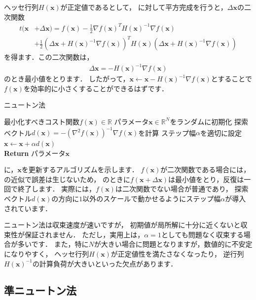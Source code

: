ヘッセ行列$H(\bm{x})$が正定値であるとして，
に対して平方完成を行うと，$\Delta\bm{x}$の二次関数
\begin{align}
t(\bm{x} &+ \Delta\bm{x}) 
= f(\bm{x}) - \frac{1}{2} \nabla f(\bm{x})^T H(\bm{x})^{-1} \nabla f(\bm{x}) 
\nonumber\\
&+ \frac{1}{2} \left(\Delta\bm{x} + H(\bm{x})^{-1} \nabla f(\bm{x})\right)^T H(\bm{x}) \left(\Delta\bm{x} + H(\bm{x})^{-1} \nabla f(\bm{x})\right)
\end{align}
を得ます．この二次関数は，
\begin{align}
 \Delta\bm{x} = - H(\bm{x})^{-1} \nabla f(\bm{x})
 \label{eqn:xi_h_n}
\end{align}
のとき最小値をとります．
したがって，$\bm{x} \gets \bm{x} - H(\bm{x})^{-1} \nabla f(\bm{x})$とすることで
$f(\bm{x})$を効率的に小さくすることができるはずです．

\begin{algobox}{ニュートン法}
\label{algo:newton}
\begin{algorithmic}[1]
\Require 最小化すべきコスト関数$f(\bm{x}) \in \mathbb{R}$
\State パラメータ$\bm{x} \in \mathbb{R}^N$をランダムに初期化
\State 探索ベクトル$d(\bm{x}) = - \left(\nabla^2 f(\bm{x})\right)^{-1} \nabla f(\bm{x})$を計算
\State ステップ幅$\alpha$を適切に設定
\State $\bm{x} \gets \bm{x} + \alpha d(\bm{x})$
\EndWhile\\
{\bf Return} パラメータ$\bm{x}$
\end{algorithmic}
\end{algobox}

に，$\bm{x}$を更新するアルゴリズムを示します．
$f(\bm{x})$が二次関数である場合には，の近似で誤差は生じないため，
のときに$f(\bm{x} + \Delta\bm{x})$は最小値をとり，反復は一回で終了します．
実際には，$f(\bm{x})$は二次関数でない場合が普通であり，
探索ベクトル$d(\bm{x})$の方向に$1$以外のスケールで動かせるようにステップ幅$\alpha$が導入されています．

ニュートン法は収束速度が速いですが，
初期値が局所解に十分に近くないと収束性が保証されません．
ただし，実用上は，$\alpha=1$としても問題なく収束する場合が多いです．
また，特に$N$が大きい場合に問題となりますが，数値的に不安定になりやすく，
ヘッセ行列$H(\bm{x})$が正定値性を満たさなくなったり，
逆行列$H(\bm{x})^{-1}$の計算負荷が大きいといった欠点があります．

\subsection{準ニュートン法}
\label{sec:quasi_newton}


